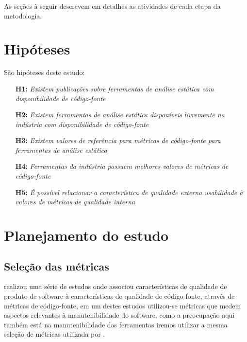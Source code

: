 \documentclass[qual, classic, a4paper]{ufbathesis}
\begin{document}
As seções à seguir descrevem em detalhes as atividades de cada etapa da metodologia.

\section{Hipóteses}

São hipóteses deste estudo:

\begin{enumerate}
  \item[{\bf H1:}] {\em Existem publicações sobre ferramentas de análise
    estática com disponibilidade de código-fonte}
  \item[{\bf H2:}] {\em Existem ferramentas de análise estática disponíveis
    livremente na indústria com disponibilidade de código-fonte}
  \item[{\bf H3:}] {\em Existem valores de referência para métricas de
    código-fonte para ferramentas de análise estática}
  \item[{\bf H4:}] {\em Ferramentas da indústria possuem melhores valores de
    métricas de código-fonte}
  \item[{\bf H5:}] {\em É possível relacionar a característica de qualidade
    externa usabilidade à valores de métricas de qualidade interna}
\end{enumerate}

\section{Planejamento do estudo}

\subsection{Seleção das métricas}

 realizou uma série de estudos onde associou
características de qualidade de produto de software à características de
qualidade de código-fonte, através de métricas de código-fonte, em um destes estudos
utilizou-se métricas que medem aspectos relevantes à manutenibilidade do
software, como a preocupação aqui também está na manutenibilidade
das ferramentas iremos utilizar a mesma seleção de métricas utilizada por
.
\end{document}
